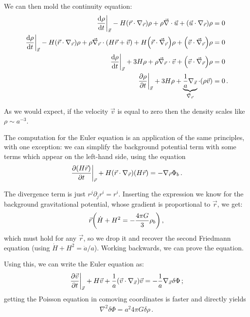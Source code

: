 \documentclass[main.tex]{subfiles}
\begin{document}
We can then mold the continuity equation:
%
\begin{align}
\eval{\dv{\rho }{t} }_{\vec{x}}
- H \qty(\vec{r}\cdot \nabla_{\vec{r}}) \rho 
+ \rho \vec{\nabla} \cdot \vec{u} 
+ \qty(\vec{u} \cdot \nabla_{\vec{r}}) \rho &= 0  \\
\eval{\dv{\rho }{t} }_{\vec{x}}
- H \qty(\vec{r}\cdot \nabla_{\vec{r}}) \rho 
+ \rho \vec{\nabla}_{\vec{r}} \cdot \qty(H \vec{r} + \vec{v}) 
+ H \qty(\vec{r} \cdot \vec{\nabla}_{\vec{r}}) \rho 
+ \qty(\vec{v} \cdot \vec{\nabla}_{\vec{r}}) \rho
&= 0 \\
\eval{\dv{\rho }{t}}_{\vec{x}} 
+ 3 H \rho
+ \rho \vec{\nabla}_{\vec{r}} \cdot \vec{v} + \qty(\vec{v} \cdot \vec{\nabla}_{\vec{r}}) \rho &= 0  \\
\eval{\pdv{\rho }{t}}_{\vec{x}} + 3 H \rho + 
  \underbrace{\frac{1}{a} \nabla_{\vec{x}}}_{\vec{\nabla}_{\vec{r}}} \cdot \qty(\rho \vec{v}) &= 0
\,.
\end{align}

As we would expect, if the velocity \(\vec{v}\) is equal to zero then the density scales like \(\rho \sim a^{-3}\). 

The computation for the Euler equation is an application of the same principles, with one exception: we can simplify the background potential term with some terms which appear on the left-hand side, using the equation
%
\begin{align}
  \eval{\pdv{(H \vec{r})}{t}}_{\vec{r}} + H \qty(\vec{r} \cdot \nabla_{\vec{r}}) (H\vec{r}) = - \nabla_{\vec{r}} \Phi_{b}
\,. 
\end{align}

The divergence term is just \(r^{j} \partial_{j} r^{i} = r^{i}\). Inserting the expression we know for the background gravitational potential, whose gradient is proportional to \(\vec{r}\), we get: 
%
\begin{align}
  \vec{r} \qty(\dot{H} +  H^2 = - \frac{4 \pi G }{3} \rho_{b } )
\,,
\end{align}
%
which must hold for any \(\vec{r}\), so we drop it and recover the second Friedmann equation (using \(\dot{H} + H^2= \ddot{a} / a\)). Working backwards, we can prove the equation. 

Using this, we can write the Euler equation as:
%
\begin{align}
  \eval{\pdv{\vec{v}}{t}}_{\vec{x}} + H \vec{v} + \frac{1}{a} \qty(\vec{v} \cdot \nabla_{\vec{x}}) \vec{v} = - \frac{1}{a} \nabla_{\vec{x}} \delta \Phi 
\,;
\end{align}
%
getting the Poisson equation in comoving coordinates is faster and directly yields 
%
\begin{align}
  \nabla^2 \delta \Phi = a^2 4 \pi G \delta \rho 
\,.
\end{align}
\end{document}
